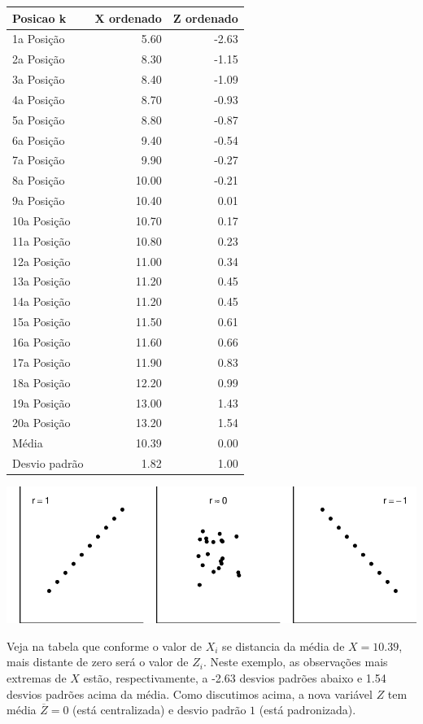 \documentclass[
]{book}
\begin{document}
\begin{tabular}{l|r|r}
\hline
Posicao k & X ordenado & Z ordenado\\
\hline
1a Posição & 5.60 & -2.63\\
\hline
2a Posição & 8.30 & -1.15\\
\hline
3a Posição & 8.40 & -1.09\\
\hline
4a Posição & 8.70 & -0.93\\
\hline
5a Posição & 8.80 & -0.87\\
\hline
6a Posição & 9.40 & -0.54\\
\hline
7a Posição & 9.90 & -0.27\\
\hline
8a Posição & 10.00 & -0.21\\
\hline
9a Posição & 10.40 & 0.01\\
\hline
10a Posição & 10.70 & 0.17\\
\hline
11a Posição & 10.80 & 0.23\\
\hline
12a Posição & 11.00 & 0.34\\
\hline
13a Posição & 11.20 & 0.45\\
\hline
14a Posição & 11.20 & 0.45\\
\hline
15a Posição & 11.50 & 0.61\\
\hline
16a Posição & 11.60 & 0.66\\
\hline
17a Posição & 11.90 & 0.83\\
\hline
18a Posição & 12.20 & 0.99\\
\hline
19a Posição & 13.00 & 1.43\\
\hline
20a Posição & 13.20 & 1.54\\
\hline
Média & 10.39 & 0.00\\
\hline
Desvio padrão & 1.82 & 1.00\\
\hline
\end{tabular}

\begin{center}\includegraphics{probest-cambientais_files/figure-latex/unnamed-chunk-161-1} \end{center}

Veja na tabela que conforme o valor de \(X_i\) se distancia da média de \(X = 10.39\), mais distante de zero será o valor de \(Z_i\). Neste exemplo, as observações mais extremas de \(X\) estão, respectivamente, a -2.63 desvios padrões abaixo e 1.54 desvios padrões acima da média. Como discutimos acima, a nova variável \(Z\) tem média \(\overline{Z} = 0\) (está centralizada) e desvio padrão \(1\) (está padronizada).
\end{document}
